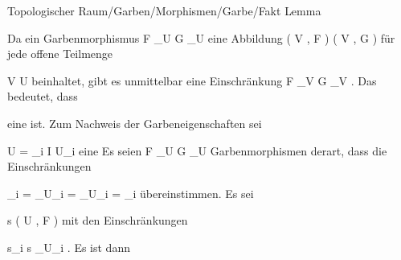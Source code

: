 {Topologischer Raum/Garben/Morphismen/Garbe/Fakt}
{Lemma}
{}
{



\faktzusatz {}
\faktzusatz {}





}
{





Da ein Garbenmorphismus
\maabbdisp {\varphi} { { \mathcal  F   } \vert_U  } { { \mathcal  G   } \vert_U
} {}
eine Abbildung
\maabbdisp {} { \Gamma   \left(   V ,  { \mathcal  F   }   \right) } { \Gamma   \left(   V ,  { \mathcal  G   }   \right)
} {}
für jede offene Teilmenge

\mavergleichskette
{\vergleichskette
{V
}
{ \subseteq }{ U
}
{  }{
}
{    }{
}
{   }{
}
}
{}{}{}
beinhaltet, gibt es unmittelbar eine Einschränkung
 { { \mathcal  F   } \vert_V  } { { \mathcal  G   } \vert_V
} {.}
Das bedeutet, dass

 {  }

eine
ist. Zum Nachweis der Garbeneigenschaften sei

\mavergleichskettedisp
{\vergleichskette
{U
}
{ =} { \bigcup_{i \in I} U_i
}
{ } {
}
{ } {
}
{ } {
}
}
{}{}{}
eine
Es seien
\maabbdisp {\varphi, \psi} { { \mathcal  F   } \vert_U  } { { \mathcal  G   } \vert_U
} {}
Garbenmorphismen derart, dass die Einschränkungen

\mavergleichskettedisp
{\vergleichskette
{ \varphi_i
}
{ =} { \varphi \vert_{U_i }
}
{ =} { \psi \vert_{U_i }
}
{ =} { \psi_i
}
{ } {
}
}
{}{}{}
übereinstimmen. Es sei

\mavergleichskette
{\vergleichskette
{s
}
{ \in }{ \Gamma   \left(   U ,  { \mathcal  F   }   \right)
}
{  }{
}
{    }{
}
{   }{
}
}
{}{}{}
mit den Einschränkungen

\mavergleichskette
{\vergleichskette
{s_i
}
{  }{ s \vert_{U_i }
}
{  }{
}
{    }{
}
{   }{
}
}
{}{}{.}
Es ist dann

}
